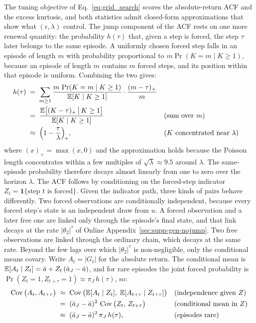 The tuning objective of Eq.~\eqref{eq:grid_search} scores the
absolute-return ACF and the excess kurtosis, and both statistics
admit closed-form approximations that show what $(\epsilon, \lambda)$
control. The jump component of the ACF rests on one more renewal
quantity: the probability $h(\tau)$ that, given a step is forced, the
step $\tau$ later belongs to the same episode. A uniformly chosen
forced step falls in an episode of length $m$ with probability
proportional to $m \Pr(K = m \mid K \ge 1)$, because an episode of
length $m$ contains $m$ forced steps, and its position within that
episode is uniform. Combining the two gives:
\begin{align}
  h(\tau)
   &\;=\; \sum_{m \ge 1}
     \frac{m\, \Pr(K = m \mid K \ge 1)}{\mathbb{E}[K \mid K \ge 1]}
     \cdot \frac{(m - \tau)_+}{m}
     \notag \\
   &\;=\; \frac{\mathbb{E}\big[(K - \tau)_+ \,\big|\, K \ge 1\big]}
     {\mathbb{E}[K \mid K \ge 1]}
     && \text{(sum over $m$)} \notag \\
   &\;\approx\; \Big(1 - \frac{\tau}{\lambda}\Big)_{\!+},
     && \text{($K$ concentrated near $\lambda$)}
  \label{eq:supp-h}
\end{align}
where $(x)_+ = \max(x, 0)$ and the approximation holds because the
Poisson length concentrates within a few multiples of
$\sqrt{\lambda} \approx 9.5$ around $\lambda$. The same-episode
probability therefore decays almost linearly from one to zero over
the horizon $\lambda$. The ACF follows by conditioning on the
forced-step indicator $Z_t = \mathbf{1}\{\text{step $t$ is forced}\}$.
Given the indicator path, three kinds of pairs behave differently.
Two forced observations are conditionally independent, because every
forced step's state is an independent draw from $u$. A forced
observation and a later free one are linked only through the
episode's final state, and that link decays at the rate
$|\theta_2|^\tau$ of Online Appendix~\ref{sec:supp-gen-nojump}. Two
free observations are linked through the ordinary chain, which decays
at the same rate. Beyond the few lags over which $|\theta_2|^\tau$ is
non-negligible, only the conditional means covary. Write
$A_t = |G_t|$ for the absolute return. The conditional mean is
$\mathbb{E}[A_t \mid Z_t] = \bar a + Z_t\, (\bar a_J - \bar a)$,
and for rare episodes the joint forced probability is
$\Pr(Z_t = 1, Z_{t+\tau} = 1) \approx \pi_J\, h(\tau)$, so:
\begin{align}
  \operatorname{Cov}\big(A_t, A_{t+\tau}\big)
   &\;\approx\;
     \operatorname{Cov}\big(\mathbb{E}[A_t \mid Z_t],\;
              \mathbb{E}[A_{t+\tau} \mid Z_{t+\tau}]\big)
     && \text{(independence given $Z$)} \notag \\
   &\;=\; (\bar a_J - \bar a)^2\,
     \operatorname{Cov}\big(Z_t,\, Z_{t+\tau}\big)
     && \text{(conditional mean in $Z$)} \notag \\
   &\;\approx\; (\bar a_J - \bar a)^2\, \pi_J\, h(\tau),
     && \text{(episodes rare)}
  \label{eq:supp-acf-wj}
\end{align}
